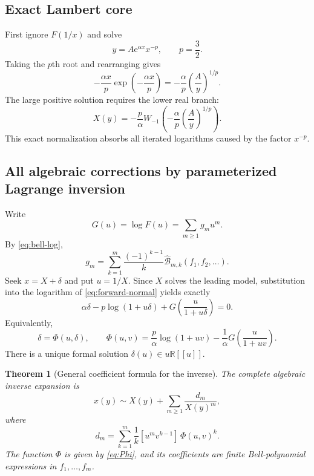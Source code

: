 \documentclass[11pt]{article}
\newtheorem{theorem}{Theorem}[section]
\theoremstyle{definition}
\theoremstyle{remark}
\newcommand{\Bell}{\widehat{\mathcal B}}
\newcommand{\e}{\mathrm e}
\newcommand{\R}{\mathbb R}
\begin{document}
\subsection{Exact Lambert core}

First ignore $F(1/x)$ and solve
\begin{equation}
 y=A\e^{\alpha x}x^{-p},\qquad p=\frac32.
 \label{eq:leading-model}
\end{equation}
Taking the $p$th root and rearranging gives
\[
 -\frac{\alpha x}{p}
 \exp\!\left(-\frac{\alpha x}{p}\right)
 =-\frac{\alpha}{p}\left(\frac{A}{y}\right)^{1/p}.
\]
The large positive solution requires the lower real branch:
\begin{equation}
 \boxed{
 X(y)=-\frac{p}{\alpha}
 W_{-1}\!\left(-\frac{\alpha}{p}
                 \left(\frac{A}{y}\right)^{1/p}\right).}
 \label{eq:Lambert-core}
\end{equation}
This exact normalization absorbs all iterated logarithms caused by the factor
$x^{-p}$.

\subsection{All algebraic corrections by parameterized Lagrange inversion}

Write
\begin{equation}
 G(u)=\log F(u)=\sum_{m\geq1}g_mu^m.
 \label{eq:G-logF}
\end{equation}
By \cref{eq:bell-log},
\begin{equation}
 \boxed{
 g_m=\sum_{k=1}^m\frac{(-1)^{k-1}}{k}
 \Bell_{m,k}(f_1,f_2,\ldots).}
 \label{eq:g-master}
\end{equation}
Seek $x=X+\delta$ and put $u=1/X$.  Since $X$ solves the leading model,
substitution into the logarithm of \cref{eq:forward-normal} yields exactly
\begin{equation}
 \alpha\delta-p\log(1+u\delta)
 +G\!\left(\frac{u}{1+u\delta}\right)=0.
 \label{eq:delta-equation}
\end{equation}
Equivalently,
\begin{equation}
 \delta=\Phi(u,\delta),
 \qquad
 \Phi(u,v)=\frac p\alpha\log(1+uv)
 -\frac1\alpha G\!\left(\frac{u}{1+uv}\right).
 \label{eq:Phi}
\end{equation}
There is a unique formal solution $\delta(u)\in u\R[[u]]$.

\begin{theorem}[General coefficient formula for the inverse]
\label{thm:inverse-coefficients}
The complete algebraic inverse expansion is
\begin{equation}
 \boxed{
 x(y)\sim X(y)+\sum_{m\geq1}\frac{d_m}{X(y)^m},}
 \label{eq:inverse-X}
\end{equation}
where
\begin{equation}
 \boxed{
 d_m=\sum_{k=1}^m\frac1k
 [u^m v^{k-1}]\,\Phi(u,v)^k.}
 \label{eq:d-master}
\end{equation}
The function $\Phi$ is given by \cref{eq:Phi}, and its coefficients are
finite Bell-polynomial expressions in $f_1,\ldots,f_m$.
\end{theorem}
\end{document}

